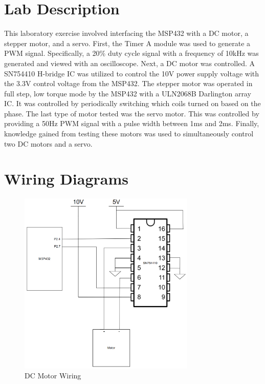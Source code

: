 \documentclass[CMPE]{KGCOEReport}
\begin{document}
\maketitle

\section*{Lab Description}

This laboratory exercise involved interfacing the MSP432 with a DC motor, a stepper motor, and a servo. First, the Timer A module was used to generate a PWM signal. Specifically, a 20\% duty cycle signal with a frequency of 10kHz was generated and viewed with an oscilloscope. Next, a DC motor was controlled. A SN754410 H-bridge IC was utilized to control the 10V power supply voltage with the 3.3V control voltage from the MSP432. The stepper motor was operated in full step, low torque mode by the MSP432 with a ULN2068B Darlington array IC. It was controlled by periodically switching which coils turned on based on the phase. The last type of motor tested was the servo motor. This was controlled by providing a 50Hz PWM signal with a pulse width between 1ms and 2ms. Finally, knowledge gained from testing these motors was used to simultaneously control two DC motors and a servo.

\section*{Wiring Diagrams}

\begin{figure}[H]
    \centering
    \includegraphics[width=0.75\textwidth]{DCMotorWiring.png}
    \caption{DC Motor Wiring}
    \label{fig:DCMotorWiring}
\end{figure}
\end{document}
